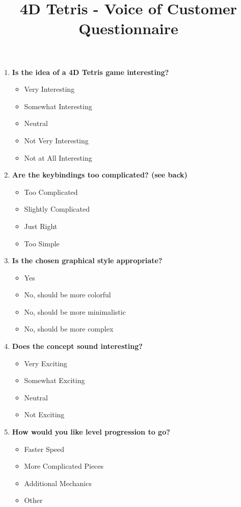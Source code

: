 \documentclass{article}
\title{4D Tetris - Voice of Customer Questionnaire}
\date{}
\begin{document}
\maketitle

\begin{multicols}{2}

    \renewcommand{\labelitemi}{\textsc{\ding{111}}}

\begin{enumerate}
    \item \textbf{Is the idea of a 4D Tetris game interesting?}
    \begin{itemize}
        \item Very Interesting
        \item Somewhat Interesting
        \item Neutral
        \item Not Very Interesting
        \item Not at All Interesting
    \end{itemize}

    \item \textbf{Are the keybindings too complicated? (see back)}
    \begin{itemize}
        \item Too Complicated
        \item Slightly Complicated
        \item Just Right
        \item Too Simple
    \end{itemize}

    \item \textbf{Is the chosen graphical style appropriate?}
    \begin{itemize}
        \item Yes
        \item No, should be more colorful
        \item No, should be more minimalistic
        \item No, should be more complex
    \end{itemize}

    \item \textbf{Does the concept sound interesting?}
    \begin{itemize}
        \item Very Exciting
        \item Somewhat Exciting
        \item Neutral
        \item Not Exciting
    \end{itemize}
    \newcolumn
    \item \textbf{How would you like level progression to go?}
    \begin{itemize}
        \item Faster Speed
        \item More Complicated Pieces
        \item Additional Mechanics
        \item Other
    \end{itemize}


\end{enumerate}
\end{multicols}
\end{document}
